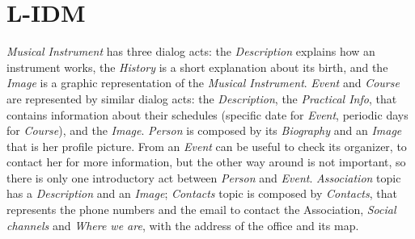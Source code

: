 \documentclass[../../DD.tex]{subfiles}
\begin{document}
\section{L-IDM}
	\textit{Musical Instrument} has three dialog acts: the \textit{Description} explains how an instrument works, the \textit{History} is a short explanation about its birth, and the \textit{Image} is a graphic representation of the \textit{Musical Instrument}.
	\textit{Event} and \textit{Course} are represented by similar dialog acts: the \textit{Description}, the \textit{Practical Info}, that contains information about their schedules (specific date for \textit{Event}, periodic days for \textit{Course}), and the \textit{Image}.
	\newline
	\textit{Person} is composed by its \textit{Biography} and an \textit{Image} that is her profile picture. From an \textit{Event} can be useful to check its organizer, to contact her for more information, but the other way around is not important, so there is only one introductory act between \textit{Person} and \textit{Event}.
	\newline
	\textit{Association} topic has a \textit{Description} and an \textit{Image}; \textit{Contacts} topic is composed by \textit{Contacts}, that represents the phone numbers and the email to contact the Association, \textit{Social channels} and \textit{Where we are}, with the address of the office and its map.
	\newline
\end{document}
